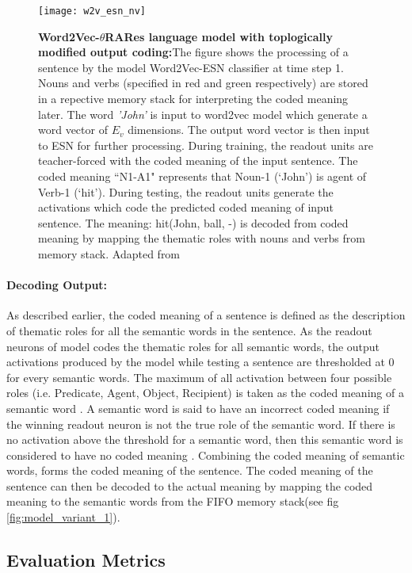 \begin{figure}[hbtp]
\centering
\texttt{[image: w2v\_esn\_nv]}
\caption[Neural comprehension of Word2Vec-$\theta$RARes Model]{\textbf{Word2Vec-$\theta$RARes language model with toplogically modified output coding:}{\small The figure shows the processing of a sentence by the model Word2Vec-ESN classifier at time step 1. Nouns and verbs (specified in red and green respectively) are stored in a repective memory stack for interpreting the coded meaning later. The word \textit{'John'} is input to word2vec model which generate a word vector of $E_{v}$ dimensions. The output word vector is then input to ESN for further processing. During training, the readout units are teacher-forced with the coded meaning of the input sentence. The coded meaning ``N1-A1" represents that Noun-1 (`John') is agent of Verb-1 (`hit'). During testing, the readout units generate the activations which code the predicted coded meaning of input sentence. The meaning: hit(John, ball, -) is decoded from coded meaning by mapping the thematic roles with nouns and verbs from memory stack. Adapted from \cite{xavier:2013:RT}} }
\label{fig:w2v_esn_nv}
\end{figure}

\paragraph{Decoding Output: } As described earlier, the coded meaning of a sentence is defined as the description of thematic roles for all the semantic words in the sentence. As the readout neurons of model codes the thematic roles for all semantic words, the output activations produced by the model while testing a sentence are thresholded at 0 for every semantic words. The maximum of all activation between four possible roles (i.e. Predicate, Agent, Object, Recipient) is taken as the coded meaning of a semantic word \cite{xavier:2013:RT}. A semantic word is said to have an incorrect coded meaning if the winning readout neuron is not the true role of the semantic word. If there is no activation above the threshold for a semantic word, then this semantic word is considered to have no coded meaning \cite{xavier:2013:RT}. Combining the coded meaning of semantic words, forms the coded meaning of the sentence. The coded meaning of the sentence can then be decoded to the actual meaning by mapping the coded meaning to the semantic words from the FIFO memory stack(see fig \ref{fig:model_variant_1}).
 
\subsection{Evaluation Metrics}\label{sec:evaluation_metrics_1}

